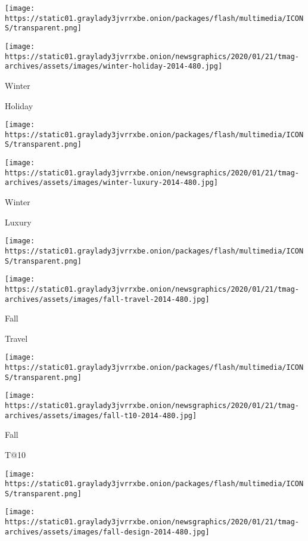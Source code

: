 \href{https://www.nytimes3xbfgragh.onion/indexes/2014/12/07/t-magazine/design-issue/index.html}{}

\texttt{[image: https://static01.graylady3jvrrxbe.onion/packages/flash/multimedia/ICONS/transparent.png]}

\texttt{[image: https://static01.graylady3jvrrxbe.onion/newsgraphics/2020/01/21/tmag-archives/assets/images/winter-holiday-2014-480.jpg]}

Winter

Holiday

\href{https://www.nytimes3xbfgragh.onion/indexes/2014/11/16/t-magazine/womens-fashion-issue/index.html}{}

\texttt{[image: https://static01.graylady3jvrrxbe.onion/packages/flash/multimedia/ICONS/transparent.png]}

\texttt{[image: https://static01.graylady3jvrrxbe.onion/newsgraphics/2020/01/21/tmag-archives/assets/images/winter-luxury-2014-480.jpg]}

Winter

Luxury

\href{https://www.nytimes3xbfgragh.onion/indexes/2014/11/02/t-magazine/travel-issue/index.html}{}

\texttt{[image: https://static01.graylady3jvrrxbe.onion/packages/flash/multimedia/ICONS/transparent.png]}

\texttt{[image: https://static01.graylady3jvrrxbe.onion/newsgraphics/2020/01/21/tmag-archives/assets/images/fall-travel-2014-480.jpg]}

Fall

Travel

\href{https://www.nytimes3xbfgragh.onion/indexes/2014/10/22/t-magazine/design-issue/index.html}{}

\texttt{[image: https://static01.graylady3jvrrxbe.onion/packages/flash/multimedia/ICONS/transparent.png]}

\texttt{[image: https://static01.graylady3jvrrxbe.onion/newsgraphics/2020/01/21/tmag-archives/assets/images/fall-t10-2014-480.jpg]}

Fall

T@10

\href{https://www.nytimes3xbfgragh.onion/indexes/2014/10/01/t-magazine/design-issue/index.html}{}

\texttt{[image: https://static01.graylady3jvrrxbe.onion/packages/flash/multimedia/ICONS/transparent.png]}

\texttt{[image: https://static01.graylady3jvrrxbe.onion/newsgraphics/2020/01/21/tmag-archives/assets/images/fall-design-2014-480.jpg]}

